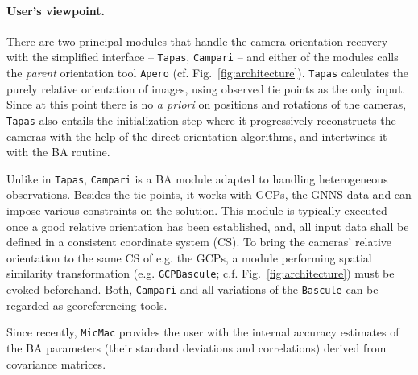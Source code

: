 \documentclass[twocolumn]{bmcart}%
\begin{document}
\paragraph*{User's viewpoint.}
There are two principal modules that handle the camera orientation recovery with the simplified interface -- {\tt Tapas}, {\tt Campari} -- and either of the modules calls the \textit{parent} orientation tool {\tt Apero} (cf. Fig.~\ref{fig:architecture}). {\tt Tapas} calculates the purely relative orientation of images, using observed tie points as the only input. Since at this point there is no \textit{a priori} on positions and rotations of the cameras, {\tt Tapas}  also entails the initialization step where it progressively reconstructs the cameras with the help of the direct orientation algorithms, and intertwines it with the BA routine. \par 
%
Unlike in {\tt Tapas}, {\tt Campari} is a BA module adapted to handling heterogeneous observations. Besides the tie points, it works with GCPs, the GNNS data and can impose various constraints on the solution. This module is typically executed once a good relative orientation has been established, and, all input data shall be defined in a consistent coordinate system (CS). To bring the cameras' relative orientation to the same CS of e.g. the GCPs, a module performing spatial similarity transformation (e.g. {\tt GCPBascule}; c.f. Fig.~\ref{fig:architecture}) must be evoked beforehand. Both, {\tt Campari} and all variations of the  {\tt Bascule} can be regarded as georeferencing tools.\par 
%
Since recently, {\tt MicMac} provides the user with the internal accuracy estimates of the BA parameters (their standard deviations and correlations) derived from covariance matrices.
\end{document}
